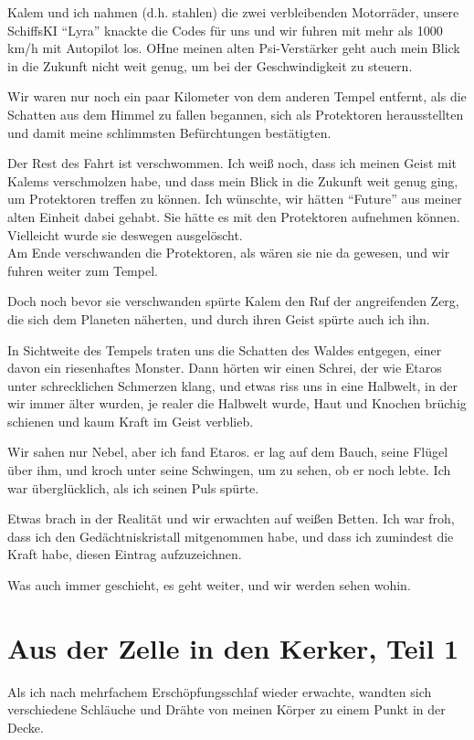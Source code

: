 \documentclass[11pt]{scrartcl}
\begin{document}
Kalem und ich nahmen (d.h. stahlen) die zwei verbleibenden Motorräder,
unsere SchiffsKI ``Lyra'' knackte die Codes für uns und wir fuhren mit
mehr als 1000 km/h mit Autopilot los. OHne meinen alten Psi-Verstärker
geht auch mein Blick in die Zukunft nicht weit genug, um bei der
Geschwindigkeit zu steuern.

Wir waren nur noch ein paar Kilometer von dem anderen Tempel entfernt,
als die Schatten aus dem Himmel zu fallen begannen, sich als Protektoren
herausstellten und damit meine schlimmsten Befürchtungen bestätigten.

Der Rest des Fahrt ist verschwommen. Ich weiß noch, dass ich meinen
Geist mit Kalems verschmolzen habe, und dass mein Blick in die Zukunft
weit genug ging, um Protektoren treffen zu können. Ich wünschte, wir
hätten ``Future'' aus meiner alten Einheit dabei gehabt. Sie hätte es
mit den Protektoren aufnehmen können. Vielleicht wurde sie deswegen
ausgelöscht.\\ Am Ende verschwanden die Protektoren, als wären sie nie
da gewesen, und wir fuhren weiter zum Tempel.

Doch noch bevor sie verschwanden spürte Kalem den Ruf der angreifenden
Zerg, die sich dem Planeten näherten, und durch ihren Geist spürte auch
ich ihn.

In Sichtweite des Tempels traten uns die Schatten des Waldes entgegen,
einer davon ein riesenhaftes Monster. Dann hörten wir einen Schrei, der
wie Etaros unter schrecklichen Schmerzen klang, und etwas riss uns in
eine Halbwelt, in der wir immer älter wurden, je realer die Halbwelt
wurde, Haut und Knochen brüchig schienen und kaum Kraft im Geist
verblieb.

Wir sahen nur Nebel, aber ich fand Etaros. er lag auf dem Bauch, seine
Flügel über ihm, und kroch unter seine Schwingen, um zu sehen, ob er
noch lebte. Ich war überglücklich, als ich seinen Puls spürte.

Etwas brach in der Realität und wir erwachten auf weißen Betten. Ich war
froh, dass ich den Gedächtniskristall mitgenommen habe, und dass ich
zumindest die Kraft habe, diesen Eintrag aufzuzeichnen.

Was auch immer geschieht, es geht weiter, und wir werden sehen wohin.

\section{Aus der Zelle in den Kerker, Teil 1}

Als ich nach mehrfachem Erschöpfungsschlaf wieder erwachte, wandten sich
verschiedene Schläuche und Drähte von meinen Körper zu einem Punkt in
der Decke.
\end{document}
